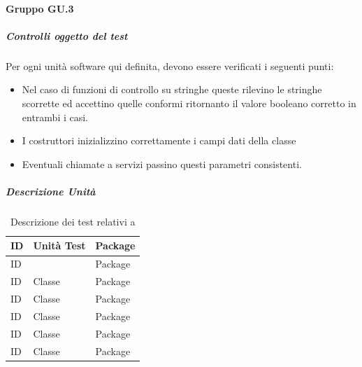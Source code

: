 \documentclass[12pt,a4paper]{article}
\begin{document}
\paragraph{Gruppo GU.3}
\subparagraph{Controlli oggetto del test}
Per ogni unità software qui definita, devono essere verificati i seguenti punti:
\begin{itemize}
	\item Nel caso di funzioni di controllo su stringhe queste rilevino le stringhe scorrette ed accettino quelle conformi ritornanto il valore booleano corretto in entrambi i casi.
	\item I costruttori inizializzino correttamente i campi dati della classe
	\item Eventuali chiamate a servizi passino  questi parametri consistenti.
\end{itemize}
\subparagraph{Descrizione Unità}
\begin{table}[H]
	\begin{center}
		\begin{tabular}{p{} p{} p{}}
			\toprule
			\textbf{ID}   & \textbf{Unità Test}	& \textbf{Package} \\ \midrule
			\midrule
			ID &  & Package\\ \midrule
			ID & Classe & Package\\ \midrule
			ID & Classe & Package\\ \midrule
			ID & Classe & Package\\ \midrule
			ID & Classe & Package\\ \midrule
			ID & Classe & Package\\ \midrule
			
			\bottomrule
		\end{tabular}
	\end{center}
	\caption{Descrizione dei test relativi a \TODO{}}
\end{table}
\end{document}
